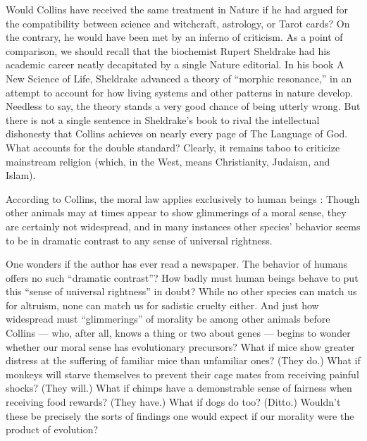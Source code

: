 \documentclass[a4paper,14pt]{extarticle}
\begin{document}
Would Collins have received the same treatment in Nature if he had argued for the compatibility between science and witchcraft, astrology, or Tarot cards?
On the contrary, he would have been met by an inferno of criticism.
As a point of comparison, we should recall that the biochemist Rupert Sheldrake had his academic career neatly decapitated by a single Nature editorial.
In his book A New Science of Life, Sheldrake advanced a theory of ``morphic resonance,'' in an attempt to account for how living systems and other patterns in nature develop.
Needless to say, the theory stands a very good chance of being utterly wrong.
But there is not a single sentence in Sheldrake’s book to rival the intellectual dishonesty that Collins achieves on nearly every page of The Language of God.
What accounts for the double standard?
Clearly, it remains taboo to criticize mainstream religion (which, in the West, means Christianity, Judaism, and Islam).

According to Collins, the moral law applies exclusively to human beings :
Though other animals may at times appear to show glimmerings of a moral sense, they are certainly not widespread, and in many instances other species’ behavior seems to be in dramatic contrast to any sense of universal rightness.

One wonders if the author has ever read a newspaper.
The behavior of humans offers no such ``dramatic contrast''?
How badly must human beings behave to put this ``sense of universal rightness'' in doubt?
While no other species can match us for altruism, none can match us for sadistic cruelty either.
And just how widespread must ``glimmerings'' of morality be among other animals before Collins --- who, after all, knows a thing or two about genes --- begins to wonder whether our moral sense has evolutionary precursors?
What if mice show greater distress at the suffering of familiar mice than unfamiliar ones?
(They do.)
What if monkeys will starve themselves to prevent their cage mates from receiving painful shocks?
(They will.)
What if chimps have a demonstrable sense of fairness when receiving food rewards?
(They have.)
What if dogs do too?
(Ditto.)
Wouldn’t these be precisely the sorts of findings one would expect if our morality were the product of evolution?
\end{document}
